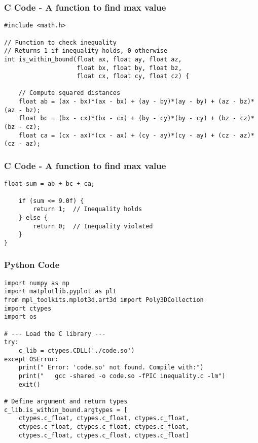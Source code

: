 \documentclass{beamer}
\begin{document}
\begin{frame}[fragile]
    \frametitle{C Code - A function to find max value}

    \begin{lstlisting}
#include <math.h>

// Function to check inequality
// Returns 1 if inequality holds, 0 otherwise
int is_within_bound(float ax, float ay, float az,
                    float bx, float by, float bz,
                    float cx, float cy, float cz) {
    
    // Compute squared distances
    float ab = (ax - bx)*(ax - bx) + (ay - by)*(ay - by) + (az - bz)*(az - bz);
    float bc = (bx - cx)*(bx - cx) + (by - cy)*(by - cy) + (bz - cz)*(bz - cz);
    float ca = (cx - ax)*(cx - ax) + (cy - ay)*(cy - ay) + (cz - az)*(cz - az);
     \end{lstlisting}
\end{frame}

\begin{frame}[fragile]
    \frametitle{C Code - A function to find max value  }

    \begin{lstlisting}
float sum = ab + bc + ca;

    if (sum <= 9.0f) {
        return 1;  // Inequality holds
    } else {
        return 0;  // Inequality violated
    }
}

     \end{lstlisting}
\end{frame}

\begin{frame}[fragile]
    \frametitle{Python Code}
    \begin{lstlisting}
import numpy as np
import matplotlib.pyplot as plt
from mpl_toolkits.mplot3d.art3d import Poly3DCollection
import ctypes
import os

# --- Load the C library ---
try:
    c_lib = ctypes.CDLL('./code.so')
except OSError:
    print(" Error: 'code.so' not found. Compile with:")
    print("   gcc -shared -o code.so -fPIC inequality.c -lm")
    exit()

# Define argument and return types
c_lib.is_within_bound.argtypes = [
    ctypes.c_float, ctypes.c_float, ctypes.c_float,
    ctypes.c_float, ctypes.c_float, ctypes.c_float,
    ctypes.c_float, ctypes.c_float, ctypes.c_float]
    \end{lstlisting}
\end{frame}
\end{document}
